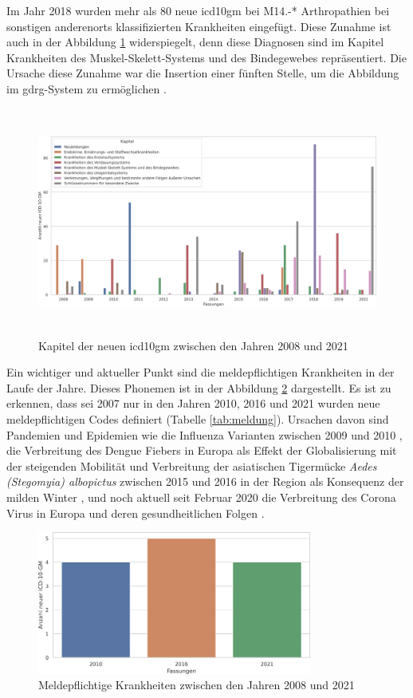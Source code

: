 Im Jahr 2018 wurden mehr als \textsf{80} neue \ac{icd10gm} bei \textsf{M14.-*} \textsf{Arthropathien bei sonstigen anderenorts klassifizierten Krankheiten} eingefügt. Diese Zunahme ist auch in der Abbildung \ref{fig:newicdcap} widerspiegelt, denn diese Diagnosen sind im Kapitel \textsf{Krankheiten des Muskel-Skelett-Systems und des Bindegewebes} repräsentiert. Die Ursache diese Zunahme war die Insertion einer fünften Stelle, um die Abbildung im \ac{gdrg}-System zu ermöglichen \cite{musk18}.

\begin{figure}[ht]
	\centering
	\includegraphics[height=7.5cm]{figures/kaptnrYear}
	\caption[Kapitel der \acs{icd10gm} pro Jahr]{Kapitel der neuen \acs{icd10gm} zwischen den Jahren 2008 und 2021}
	\label{fig:newicdcap}
\end{figure} 

Ein wichtiger und aktueller Punkt sind die meldepflichtigen Krankheiten in der Laufe der Jahre. Dieses Phonemen ist in der Abbildung \ref{fig:newicdmeld} dargestellt. Es ist zu erkennen, dass sei 2007 nur in den Jahren 2010, 2016 und 2021 wurden neue meldepflichtigen Codes definiert (Tabelle \ref{tab:meldung}). Ursachen davon sind Pandemien und Epidemien wie die Influenza Varianten zwischen 2009 und 2010 \cite{influenza1, influenza2}, die Verbreitung des Dengue Fiebers in Europa als Effekt der Globalisierung mit der steigenden Mobilität \cite{denge1} und Verbreitung der asiatischen Tigermücke \textsl{Aedes (Stegomyia) albopictus} zwischen 2015 und 2016 in der Region als Konsequenz der milden Winter \cite{denge2}, und noch aktuell seit Februar 2020 die Verbreitung des Corona Virus in Europa \cite{corona1} und deren gesundheitlichen Folgen \cite{corona2}.

\clearpage
\begin{figure}[ht]
	\centering
	\includegraphics[height=4.7cm]{figures/arztJaYear}
	\caption[Meldepflichtige \acs{icd10gm} pro Jahr]{Meldepflichtige Krankheiten zwischen den Jahren 2008 und 2021}
	\label{fig:newicdmeld}
\end{figure} 

